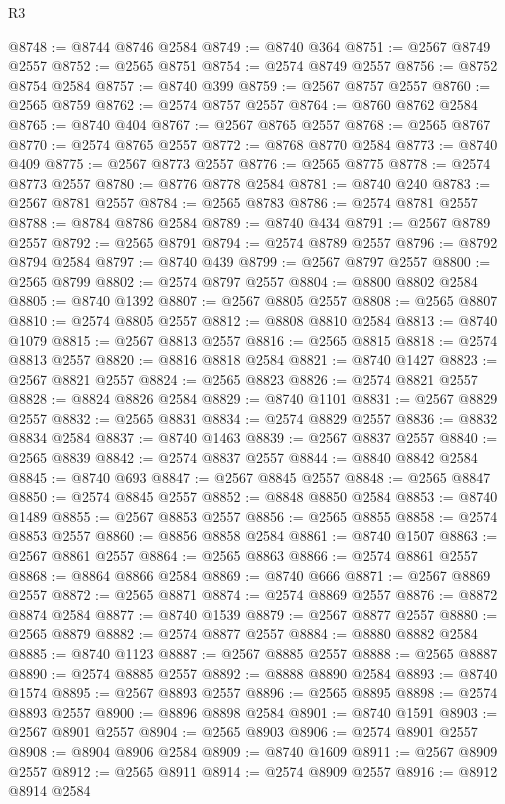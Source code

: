 \begin{lexlean}{R3}
\begin{coremodule}
@8748 := @8744 @8746 @2584
@8749 := @8740 @364
@8751 := @2567 @8749 @2557
@8752 := @2565 @8751
@8754 := @2574 @8749 @2557
@8756 := @8752 @8754 @2584
@8757 := @8740 @399
@8759 := @2567 @8757 @2557
@8760 := @2565 @8759
@8762 := @2574 @8757 @2557
@8764 := @8760 @8762 @2584
@8765 := @8740 @404
@8767 := @2567 @8765 @2557
@8768 := @2565 @8767
@8770 := @2574 @8765 @2557
@8772 := @8768 @8770 @2584
@8773 := @8740 @409
@8775 := @2567 @8773 @2557
@8776 := @2565 @8775
@8778 := @2574 @8773 @2557
@8780 := @8776 @8778 @2584
@8781 := @8740 @240
@8783 := @2567 @8781 @2557
@8784 := @2565 @8783
@8786 := @2574 @8781 @2557
@8788 := @8784 @8786 @2584
@8789 := @8740 @434
@8791 := @2567 @8789 @2557
@8792 := @2565 @8791
@8794 := @2574 @8789 @2557
@8796 := @8792 @8794 @2584
@8797 := @8740 @439
@8799 := @2567 @8797 @2557
@8800 := @2565 @8799
@8802 := @2574 @8797 @2557
@8804 := @8800 @8802 @2584
@8805 := @8740 @1392
@8807 := @2567 @8805 @2557
@8808 := @2565 @8807
@8810 := @2574 @8805 @2557
@8812 := @8808 @8810 @2584
@8813 := @8740 @1079
@8815 := @2567 @8813 @2557
@8816 := @2565 @8815
@8818 := @2574 @8813 @2557
@8820 := @8816 @8818 @2584
@8821 := @8740 @1427
@8823 := @2567 @8821 @2557
@8824 := @2565 @8823
@8826 := @2574 @8821 @2557
@8828 := @8824 @8826 @2584
@8829 := @8740 @1101
@8831 := @2567 @8829 @2557
@8832 := @2565 @8831
@8834 := @2574 @8829 @2557
@8836 := @8832 @8834 @2584
@8837 := @8740 @1463
@8839 := @2567 @8837 @2557
@8840 := @2565 @8839
@8842 := @2574 @8837 @2557
@8844 := @8840 @8842 @2584
@8845 := @8740 @693
@8847 := @2567 @8845 @2557
@8848 := @2565 @8847
@8850 := @2574 @8845 @2557
@8852 := @8848 @8850 @2584
@8853 := @8740 @1489
@8855 := @2567 @8853 @2557
@8856 := @2565 @8855
@8858 := @2574 @8853 @2557
@8860 := @8856 @8858 @2584
@8861 := @8740 @1507
@8863 := @2567 @8861 @2557
@8864 := @2565 @8863
@8866 := @2574 @8861 @2557
@8868 := @8864 @8866 @2584
@8869 := @8740 @666
@8871 := @2567 @8869 @2557
@8872 := @2565 @8871
@8874 := @2574 @8869 @2557
@8876 := @8872 @8874 @2584
@8877 := @8740 @1539
@8879 := @2567 @8877 @2557
@8880 := @2565 @8879
@8882 := @2574 @8877 @2557
@8884 := @8880 @8882 @2584
@8885 := @8740 @1123
@8887 := @2567 @8885 @2557
@8888 := @2565 @8887
@8890 := @2574 @8885 @2557
@8892 := @8888 @8890 @2584
@8893 := @8740 @1574
@8895 := @2567 @8893 @2557
@8896 := @2565 @8895
@8898 := @2574 @8893 @2557
@8900 := @8896 @8898 @2584
@8901 := @8740 @1591
@8903 := @2567 @8901 @2557
@8904 := @2565 @8903
@8906 := @2574 @8901 @2557
@8908 := @8904 @8906 @2584
@8909 := @8740 @1609
@8911 := @2567 @8909 @2557
@8912 := @2565 @8911
@8914 := @2574 @8909 @2557
@8916 := @8912 @8914 @2584

\end{coremodule}
\end{lexlean}
